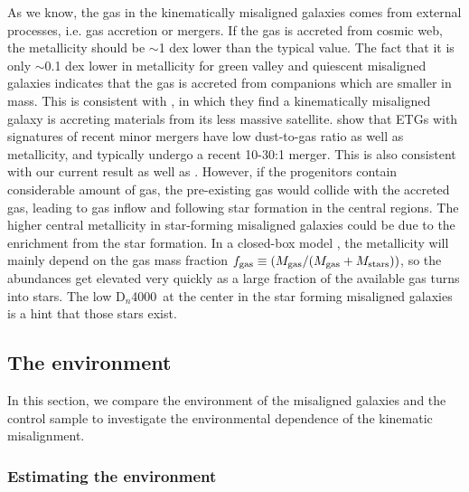 \documentclass[a4paper,fleqn,usenatbib]{mnras}
\newcommand{\dindex}{D$_n$4000}
\begin{document}
As we know, the gas in the kinematically misaligned galaxies comes from external processes, i.e. gas accretion or mergers. If the gas is accreted from cosmic web, the metallicity should be $\sim$1 dex lower than the typical value. The fact that it is only $\sim$0.1 dex lower in metallicity for green valley and quiescent misaligned galaxies indicates that the gas is accreted from companions which are smaller in mass. This is consistent with \cite{cheung-2016}%
, in which they find a kinematically misaligned galaxy is accreting materials from its less massive satellite. 
\cite{davis-2015} show that ETGs with signatures of recent minor mergers have low dust-to-gas ratio as well as metallicity, and typically undergo a recent 10-30:1 merger. This is also consistent with our current result as well as \cite{cheung-2016}. %
However, if the progenitors contain considerable amount of gas, the pre-existing gas would collide with the accreted gas, leading to gas inflow and following star formation in the central regions. The higher central metallicity in star-forming misaligned galaxies could be due to the enrichment from the star formation. In a closed-box model \citep{dalcanton-2007}, the metallicity will mainly depend on the gas mass fraction $f_{\rm gas}\equiv(M_{\rm gas}/(M_{\rm gas} + M_{\rm stars}))$, so the abundances get elevated very quickly as a large fraction of the available gas turns into stars. The low \dindex\ at the center in the star forming misaligned galaxies is a hint that those stars exist.


\subsection{The environment}\label{sec: environment}


In this section, we compare the environment of the misaligned galaxies and the control sample to investigate the environmental dependence of the kinematic misalignment.  

\subsubsection{Estimating the environment}\label{sec:estimate_envir}
\end{document}
